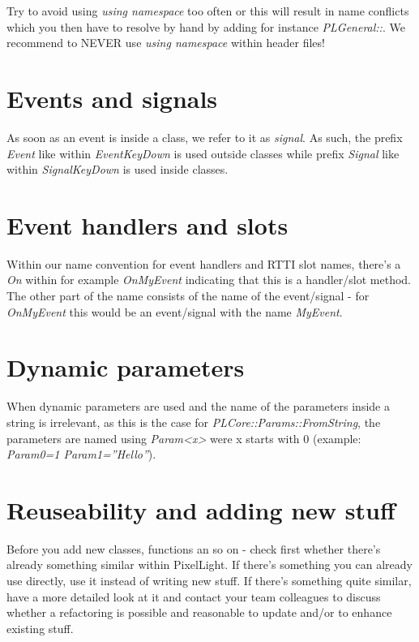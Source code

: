 Try to avoid using \emph{using namespace} too often or this will result in name conflicts which you then have to resolve by hand by adding for instance \emph{PLGeneral::}. We recommend to NEVER use \emph{using namespace} within header files!




\section{Events and signals}
As soon as an event is inside a class, we refer to it as \emph{signal}. As such, the prefix \emph{Event} like within \emph{EventKeyDown} is used outside classes while prefix \emph{Signal} like within \emph{SignalKeyDown} is used inside classes.




\section{Event handlers and slots}
Within our name convention for event handlers and RTTI slot names, there's a \emph{On} within for example \emph{OnMyEvent} indicating that this is a handler/slot method. The other part of the name consists of the name of the event/signal - for \emph{OnMyEvent} this would be an event/signal with the name \emph{MyEvent}.




\section{Dynamic parameters}
When dynamic parameters are used and the name of the parameters inside a string is irrelevant, as this is the case for \emph{PLCore::Params::FromString}, the parameters are named using \emph{Param<x>} were x starts with $0$ (example: \emph{Param0=1 Param1=''Hello''}).  




\section{Reuseability and adding new stuff}
Before you add new classes, functions an so on - check first whether there's already something similar within PixelLight. If there's something you can already use directly, use it instead of writing new stuff. If there's something quite similar, have a more detailed look at it and contact your team colleagues to discuss whether a refactoring is possible and reasonable to update and/or to enhance existing stuff.

